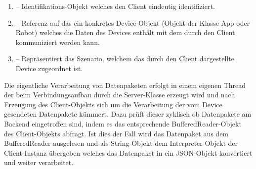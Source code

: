 \begin{enumerate}
	\item{} -- Identifikations-Objekt welches den Client eindeutig identifiziert.
	\item{} -- Referenz auf das ein konkretes Device-Objekt (Objekt der Klasse App oder Robot) welches die 
	Daten des Devices enthält mit dem durch den Client kommuniziert werden kann.
	\item{} -- Repräsentiert das Szenario, welchem das durch den Client dargestellte Device zugeordnet ist. 
\end{enumerate}
Die eigentliche Verarbeitung von Datenpaketen erfolgt in einem eigenen Thread der beim Verbindungsaufbau durch die Server-Klasse erzeugt wird und nach
Erzeugung des Client-Objekts sich um die Verarbeitung der vom Device gesendeten Datenpakete kümmert. Dazu prüft dieser zyklisch ob
Datenpakete am Backend eingetroffen sind, indem es das entsprechende BufferedReader-Objekt des Client-Objekts abfragt. Ist dies der Fall
wird das Datenpaket aus dem BufferedReader ausgelesen und als String-Objekt dem Interpreter-Objekt der Client-Instanz übergeben welches
das Datenpaket in ein JSON-Objekt konvertiert und weiter verarbeitet.
